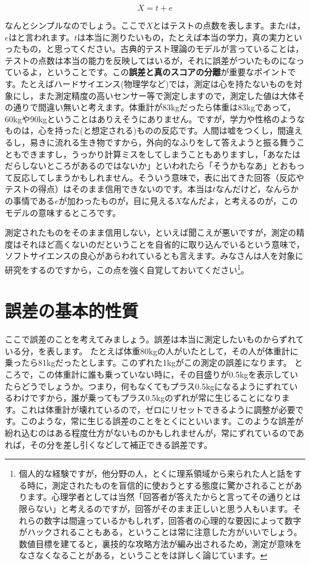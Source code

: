\documentclass{ltjbook}
\begin{document}
\[ X = t + e \]

なんとシンプルなのでしょう。ここで$X$とはテストの点数を表します。また$t$は，$e$はと言われます。$t$は本当に測りたいもの，たとえば本当の学力，真の実力といったもの，と思ってください。古典的テスト理論のモデルが言っていることは，テストの点数は本当の能力を反映してはいるが，それに誤差がついたものになっているよ，ということです。この\textbf{誤差と真のスコアの分離}が重要なポイントです。たとえばハードサイエンス(物理学など)では，測定は心を持たないものを対象にし，また測定精度の高いセンサー等で測定しますので，測定した値は大体その通りで間違い無いと考えます。体重計が83kgだったら体重は83kgであって，60kgや90kgということはありえそうにありません。ですが，学力や性格のようなものは，心を持った(と想定される)ものの反応です。人間は嘘をつくし，間違えるし，易きに流れる生き物ですから，外向的なふりをして答えようと振る舞うこともできますし，うっかり計算ミスをしてしまうこともありますし，「あなたはだらしないところがあるのではないか」といわれたら「そうかもなあ」とおもって反応してしまうかもしれません。そういう意味で，表に出てきた回答（反応やテストの得点）はそのまま信用できないのです。本当は$t$なんだけど，なんらかの事情である$e$が加わったものが，目に見える$X$なんだよ，と考えるのが，このモデルの意味するところです。

測定されたものをそのまま信用しない，といえば聞こえが悪いですが，測定の精度はそれほど高くないのだということを自省的に取り込んでいるという意味で，ソフトサイエンスの良心があらわれているとも言えます。みなさんは人を対象に研究をするのですから，この点を強く自覚しておいてください\footnote{個人的な経験ですが，他分野の人，とくに理系領域から来られた人と話をする時に，測定されたものを盲信的に使おうとする態度に驚かされることがあります。心理学者としては当然「回答者が答えたからと言ってその通りとは限らない」と考えるのですが，回答がそのまま正しいと思う人もいます。それらの数字は間違っているかもしれず，回答者の心理的な要因によって数字がハックされることもある，ということは常に注意した方がいいでしょう。数値目標を建てると，裏技的な攻略方法が編み出されるため，測定が意味をなさなくなることがある，ということを\textcite{Jerry2019}は詳しく論じています。}。


\section{誤差の基本的性質}
ここで誤差のことを考えてみましょう。誤差は本当に測定したいものからずれている分，を表します。
たとえば体重80kgの人がいたとして，その人が体重計に乗ったら81kgだったとします。このずれた1kgがこの測定の誤差になります。
ところで，この体重計に誰も乗っていない時に，その目盛りが0.5kgを表示していたらどうでしょうか。つまり，何もなくてもプラス0.5kgになるようにずれているわけですから，誰が乗ってもプラス0.5kgのずれが常に生じることになります。これは体重計が壊れているので，ゼロにリセットできるように調整が必要です。このような，常に生じる誤差のことをとくにといいます。このような誤差が紛れ込むのはある程度仕方がないものかもしれませんが，常にずれているのであれば，その分を差し引くなどして補正できる誤差です。
\end{document}
